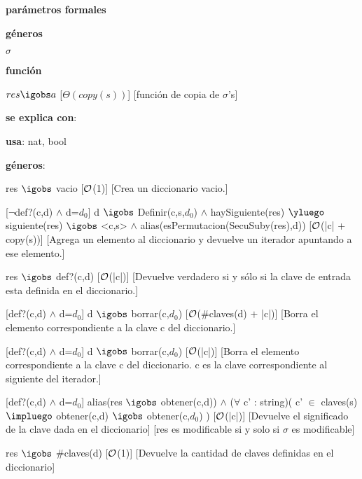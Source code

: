 \begin{Interfaz}

	\textbf{parámetros formales}\parindent\\
	\parbox{1.7cm}{\textbf{géneros}} $\sigma$\\
	\parbox[t]{1.7cm}{\textbf{función}}\parbox[t]{\textwidth-2\parindent-1.7cm}{%
	    	{$res \igobs a$}
		[$\Theta(copy(s))$]
		[función de copia de $\sigma$'s]
	}
	
	\textbf{se explica con}: 
	
	\textbf{usa}: nat, bool

	\textbf{géneros}: 
	
	
	{res $\igobs$ vacio}
	[$\mathcal{O}$(1)]
	[Crea un diccionario vacio.]
	
	[$\neg$def?(c,d) $\land$ d=$d_0$]
	{d $\igobs$ Definir(c,s,$d_0$) $\land$ haySiguiente(res) $\yluego$ siguiente(res) $\igobs$ <c,s> $\land$ alias(esPermutacion(SecuSuby(res),d))}
	[$\mathcal{O}$(|c| + copy(s))]
	[Agrega un elemento al diccionario y devuelve un iterador apuntando a ese elemento.]	
	
	{res $\igobs$ def?(c,d)}
	[$\mathcal{O}$(|c|)]
	[Devuelve verdadero si y sólo si la clave de entrada esta definida en el diccionario.]	
	
	[def?(c,d) $\land$ d=$d_0$]
	{d $\igobs$ borrar(c,$d_0$)}
	[$\mathcal{O}$($\#$claves(d) $+$ |c|)]
	[Borra el elemento correspondiente a la clave c del diccionario.]
	
	[def?(c,d) $\land$ d=$d_0$]
	{d $\igobs$ borrar(c,$d_0$)}
	[$\mathcal{O}$(|c|)]
	[Borra el elemento correspondiente a la clave c del diccionario. c es la clave correspondiente al siguiente del iterador.]
	
	[def?(c,d) $\land$ d=$d_0$]
	{alias(res $\igobs$ obtener(c,d)) $\land$ ($\forall$ c' : string)( c' $\in$ claves(s) $\impluego$ obtener(c,d) $\igobs$ obtener(c,$d_0$) )}
	[$\mathcal{O}$(|c|)]
	[Devuelve el significado de la clave dada en el diccionario]
	[res es modificable si y solo si $\sigma$ es modificable]
	
	{res $\igobs$ $\#$claves(d)}
	[$\mathcal{O}$(1)]
	[Devuelve la cantidad de claves definidas en el diccionario]
	
\end{Interfaz}

